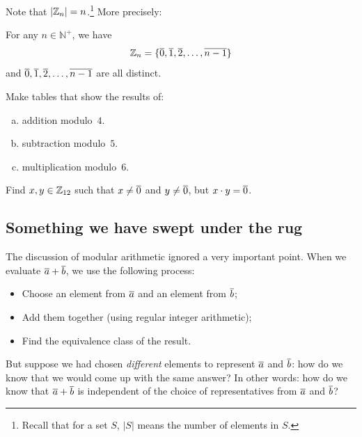 Note that $\left|\mathbb{Z}_n \right| = n$.\footnote{Recall that for a set $S$, $|S|$ means the number of elements in $S$.} More precisely:

\begin{prop}
For any $n \in \mathbb{N}^+$, we have 
	$$\mathbb{Z}_n = \{ \overline{0}, \overline{1}, \overline{2}, \ldots, \overline{n-1} \}$$
and\/ $\overline{0}, \overline{1}, \overline{2}, \ldots, \overline{n-1}$ are all distinct.
\end{prop}


\begin{exercise}\label{exercise:EquivalenceRelationsChap:ModArithEx}  
Make tables that show the results of:
\begin{enumerate}[(a)]
\item \label{ModArithEx-tables-addition} 
addition modulo~$4$.
\item \label{ModArithEx-tables-subtraction} 
subtraction modulo~$5$.
\item \label{ModArithEx-tables-multiplication} 
multiplication modulo~$6$.
\end{enumerate}
\end{exercise}

\begin{exercise}\label{exercise:EquivalenceRelationsChap:ModArithEx2}  
Find $x,y \in \mathbb{Z}_{12}$ such that $x \neq \overline{0}$ and $y \neq \overline{0}$, but $x \cdot y = \overline{0}$.
\end{exercise}

\subsection{Something we have swept under the rug} \label{EquivalenceRelationsWellDefSect}

The discussion of modular arithmetic ignored a very important point. When we evaluate $\overline{a} \mathbin{+} \overline{b}$, we use the following process:
\begin{itemize}
\item
Choose an element from  $\overline{a}$ and an element from $\overline{b}$;
\item
Add them together (using regular integer arithmetic);
\item
Find the equivalence class of the result. 
\end{itemize}

But suppose we had chosen \emph{different} elements to represent $\overline{a}$ and $\overline{b}$: how do we know that we would come up with the same answer? In other words: how do we know that $\overline{a} \mathbin{+} \overline{b}$ is independent of the choice of representatives from $\overline{a}$ and $\overline{b}$?

